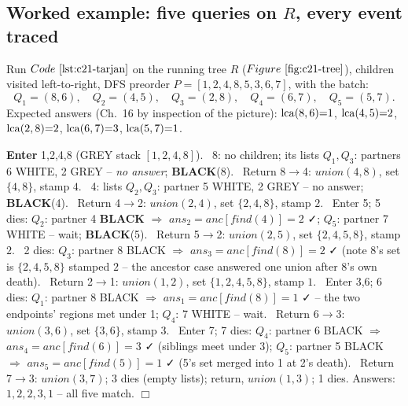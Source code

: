 \subsection{Worked example: five queries on \(R\), every event traced}

Run \(\coderef{c21-tarjan}\) on the running tree \(R\) (\(\figref{c21-tree}\)),
children visited left-to-right, DFS preorder \(P=[1,2,4,8,5,3,6,7]\), with the
batch:
\[
  Q_1=(8,6),\quad Q_2=(4,5),\quad Q_3=(2,8),\quad Q_4=(6,7),\quad Q_5=(5,7).
\]
Expected answers (Ch.~16 by inspection of the picture):
\(\operatorname{lca}(8,6){=}1\), \(\operatorname{lca}(4,5){=}2\), \(\operatorname{lca}(2,8){=}2\), \(\operatorname{lca}(6,7){=}3\),
\(\operatorname{lca}(5,7){=}1\).

\begin{tracebox}
\textbf{Enter} 1,2,4,8 (GREY stack \([1,2,4,8]\)). \
8: no children; its lists \(Q_1,Q_3\): partners 6 WHITE, 2 GREY -- \emph{no
answer}; \textbf{BLACK}(8). \
Return 8\(\to\)4: \(\mathit{union}(4,8)\), set \(\{4,8\}\), stamp \(4\). \
4: lists \(Q_2,Q_3\): partner 5 WHITE, 2 GREY -- no answer;
\textbf{BLACK}(4). \
Return 4\(\to\)2: \(\mathit{union}(2,4)\), set \(\{2,4,8\}\), stamp \(2\). \
Enter 5; 5 dies: \(Q_2\): partner 4 \textbf{BLACK} \(\Rightarrow\)
\(\mathit{ans}_2=\mathit{anc}[\mathit{find}(4)]=\boxed{2}\) ✓;
\(Q_5\): partner 7 WHITE -- wait; \textbf{BLACK}(5). \
Return 5\(\to\)2: \(\mathit{union}(2,5)\), set \(\{2,4,5,8\}\), stamp \(2\). \
2 dies: \(Q_3\): partner 8 BLACK \(\Rightarrow\)
\(\mathit{ans}_3=\mathit{anc}[\mathit{find}(8)]=\boxed{2}\) ✓ (note 8's set is
\(\{2,4,5,8\}\) stamped \(2\) -- the ancestor case answered one union after
8's own death). \
Return 2\(\to\)1: \(\mathit{union}(1,2)\), set \(\{1,2,4,5,8\}\), stamp \(1\). \
Enter 3,6; 6 dies: \(Q_1\): partner 8 BLACK \(\Rightarrow\)
\(\mathit{ans}_1=\mathit{anc}[\mathit{find}(8)]=\boxed{1}\) ✓ -- the two
endpoints' regions met under 1; \(Q_4\): 7 WHITE -- wait. \
Return 6\(\to\)3: \(\mathit{union}(3,6)\), set \(\{3,6\}\), stamp \(3\). \
Enter 7; 7 dies: \(Q_4\): partner 6 BLACK \(\Rightarrow\)
\(\mathit{ans}_4=\mathit{anc}[\mathit{find}(6)]=\boxed{3}\) ✓ (siblings meet
under 3); \(Q_5\): partner 5 BLACK \(\Rightarrow\)
\(\mathit{ans}_5=\mathit{anc}[\mathit{find}(5)]=\boxed{1}\) ✓ (5's set merged
into 1 at 2's death). \
Return 7\(\to\)3: \(\mathit{union}(3,7)\); 3 dies (empty lists); return,
\(\mathit{union}(1,3)\); 1 dies.  Answers: \(1,2,2,3,1\) -- all five match.
\(\Box\)
\end{tracebox}

